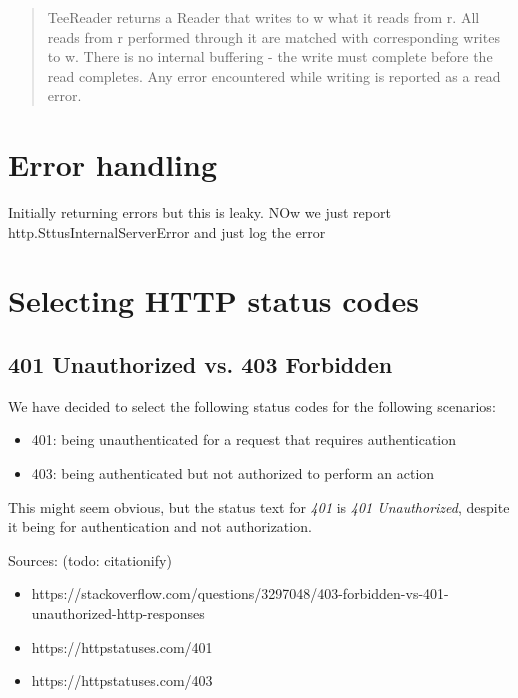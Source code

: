 \documentclass[bsc,frontabs,twoside,singlespacing,parskip,deptreport]{infthesis}     %
\begin{document}
\begin{quote}
  TeeReader returns a Reader that writes to w what it reads from r. All reads from r performed through it are matched with corresponding writes to w. There is no internal buffering - the write must complete before the read completes. Any error encountered while writing is reported as a read error.
\end{quote}

\section{Error handling}

Initially returning errors but this is leaky. NOw we just report http.SttusInternalServerError and just log the error

\section{Selecting HTTP status codes}

\subsection{401 Unauthorized vs. 403 Forbidden}

We have decided to select the following status codes for the following scenarios:

\begin{itemize}
  \item 401: being unauthenticated for a request that requires authentication
  \item 403: being authenticated but not authorized to perform an action
\end{itemize}

This might seem obvious, but the status text for \emph{401} is \emph{401 Unauthorized},
despite it being for authentication and not authorization.

Sources: (todo: citationify)
\begin{itemize}
  \item https://stackoverflow.com/questions/3297048/403-forbidden-vs-401-unauthorized-http-responses
  \item https://httpstatuses.com/401
  \item https://httpstatuses.com/403
\end{itemize}





\end{document}
